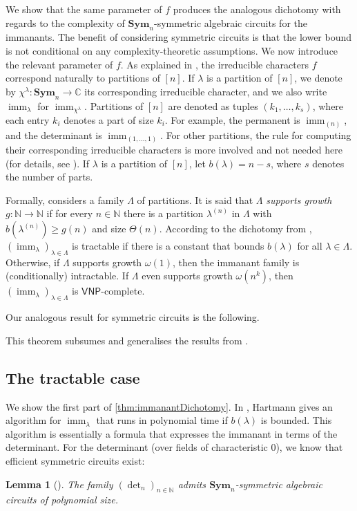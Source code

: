 \documentclass[11pt, DIV=15]{scrarticle}
\theoremstyle{definition}
\theoremstyle{plain}
\newtheorem{lemma}[definition]{Lemma}
\theoremstyle{remark}
\newcommand{\Sym}{\mathbf{Sym}}
\newcommand{\bbN}{\mathbb{N}}
\DeclareMathOperator{\imm}{imm}
\newcommand{\VNP}{\mathsf{VNP}}
\begin{document}
	We show that the same parameter of $f$ produces the analogous dichotomy with regards to the complexity of $\Sym_n$-symmetric algebraic circuits for the immanants. The benefit of considering symmetric circuits is that the lower bound is not conditional on any complexity-theoretic assumptions. 
	We now introduce the relevant parameter of $f$. As explained in \cite{curticapean2021full}, the irreducible characters $f$ correspond naturally to partitions of $[n]$. If $\lambda$ is a partition of $[n]$, we denote by $\chi^{\lambda}\colon \Sym_n \to \mathbb{C}$ its corresponding irreducible character, and we also write $\imm_{\lambda}$ for $\imm_{\chi^\lambda}$. Partitions of $[n]$ are denoted as tuples $(k_1,\dots ,k_s)$, where each entry $k_i$ denotes a part of size $k_i$.
	For example, the permanent is $\imm_{(n)}$, and the determinant is $\imm_{(1,\dots ,1)}$. For other partitions, the rule for computing their corresponding irreducible characters is more involved and not needed here (for details, see \cite{curticapean2021full}).
	 If $\lambda$ is a partition of $[n]$, let $b(\lambda) = n-s$, where $s$ denotes the number of parts. 
	
	Formally, \cite{curticapean2021full} considers a family $\Lambda$ of partitions. It is said that $\Lambda$ \emph{supports growth} $g \colon \bbN \to \bbN$ if for every $n \in \bbN$ there is a partition $\lambda^{(n)}$ in $\Lambda$ with $b(\lambda^{(n)}) \geq g(n)$ and size $\Theta(n)$. According to the dichotomy from \cite{curticapean2021full}, $(\imm_{\lambda})_{\lambda \in \Lambda}$ is tractable if there is a constant that bounds $b(\lambda)$ for all $\lambda \in \Lambda$. Otherwise, if $\Lambda$ supports growth $\omega(1)$, then the immanant family is (conditionally) intractable. If $\Lambda$ even supports growth $\omega(n^k)$, then $(\imm_{\lambda})_{\lambda \in \Lambda}$ is $\VNP$-complete.
	
Our analogous result for symmetric circuits is the following.
\immanantDichotomy*

This theorem subsumes and generalises the results from \cite{dawar_symmetric_2025}. 
	 
	


\subsection{The tractable case}

We show the first part of \cref{thm:immanantDichotomy}.
In \cite{hartmann1985complexity}, Hartmann gives an algorithm for $\imm_{\lambda}$ that runs in polynomial time if $b(\lambda)$ is bounded. This algorithm is essentially a formula that expresses the immanant in terms of the determinant. For the determinant (over fields of characteristic 0), we know that efficient symmetric circuits exist: 
\begin{lemma}[\cite{dawar_symmetric_2025}]
	\label{lem:determinantEfficient}
	The family $(\det_n)_{n \in \bbN}$ admits $\Sym_n$-symmetric algebraic circuits of polynomial size. 
\end{lemma}	
\end{document}
